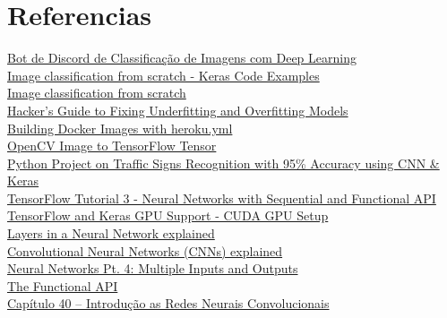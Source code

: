 \documentclass{article}
\begin{document}
\section{Referencias}
\href{https://crivelaro.notion.site/Bot-de-Discord-de-Classifica-o-de-Imagens-com-Deep-Learning-498ca37d41c549fb90c403f8ccf3804e}{Bot de Discord de Classificação de Imagens com Deep Learning}\\
\href{https://www.youtube.com/watch?v=dFdMyUbtKM4}{Image classification from scratch - Keras Code Examples}\\
\href{https://keras.io/examples/vision/image_classification_from_scratch/}{Image classification from scratch}\\
\href{https://curiousily.com/posts/hackers-guide-to-fixing-underfitting-and-overfitting-models/}{Hacker's Guide to Fixing Underfitting and Overfitting Models}\\
\href{https://devcenter.heroku.com/articles/build-docker-images-heroku-yml}{Building Docker Images with heroku.yml}\\
\href{https://wavesofvoqueric.com/software/2020/03/31/19/29/opencv-image-to-tensorflow-tensor/}{OpenCV Image to TensorFlow Tensor}\\
\href{https://data-flair.training/blogs/python-project-traffic-signs-recognition/}{Python Project on Traffic Signs Recognition with 95\% Accuracy using CNN \& Keras}\\
\href{https://www.youtube.com/watch?v=pAhPiF3yiXI}{TensorFlow Tutorial 3 - Neural Networks with Sequential and Functional API}\\
\href{https://www.youtube.com/watch?v=IubEtS2JAiY&list=PLZbbT5o_s2xrwRnXk_yCPtnqqo4_u2YGL&index=2}{TensorFlow and Keras GPU Support - CUDA GPU Setup}\\
\href{https://www.youtube.com/watch?v=FK77zZxaBoI}{Layers in a Neural Network explained}\\
\href{https://www.youtube.com/watch?v=YRhxdVk_sIs}{Convolutional Neural Networks (CNNs) explained}\\
\href{https://www.youtube.com/watch?v=83LYR-1IcjA}{Neural Networks Pt. 4: Multiple Inputs and Outputs}\\
\href{https://keras.io/guides/functional_api/}{The Functional API}\\
\href{https://www.deeplearningbook.com.br/introducao-as-redes-neurais-convolucionais/}{Capítulo 40 – Introdução as Redes Neurais Convolucionais}\\
\end{document}
